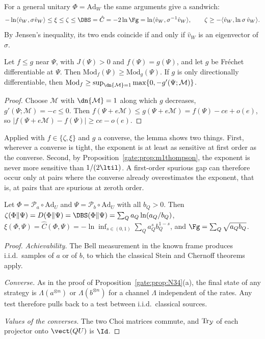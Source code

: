 For a general unitary $\Phi=\mathrm{Ad}_W$ the same arguments give a sandwich:
\begin{equation}\label{gate:eq:m1sandwich}
-\ln\langle\hat v_W,\sigma\hat v_W\rangle\le\xi\le\zeta\le\DBS=\hat C=-2\ln\Fg=\ln\langle\hat v_W,\sigma^{-1}\hat v_W\rangle,\qquad\zeta\ge-\langle\hat v_W,\ln\sigma\,\hat v_W\rangle.
\end{equation}
By Jensen's inequality, its two ends coincide if and only if $\hat v_W$ is an eigenvector of $\sigma$.

\begin{lemma}\label{gate:lem:m1tight}
Let $f\le g$ near $\Psi$, with $J(\Psi)>0$ and $f(\Psi)=g(\Psi)$, and let $g$ be Fr\'echet differentiable at $\Psi$. Then $\mathrm{Mod}_f(\Psi)\ge\mathrm{Mod}_g(\Psi)$. If $g$ is only directionally differentiable, then $\mathrm{Mod}_f\ge\sup_{\dn{\mathcal M}=1}\max\{0,-g'(\Psi;\mathcal M)\}$.
\end{lemma}

\begin{proof}
Choose $\mathcal M$ with $\dn{\mathcal M}=1$ along which $g$ decreases, $g'(\Psi;\mathcal M)=-c\le0$. Then $f(\Psi+e\mathcal M)\le g(\Psi+e\mathcal M)=f(\Psi)-ce+o(e)$, so $|f(\Psi+e\mathcal M)-f(\Psi)|\ge ce-o(e)$.
\end{proof}

Applied with $f\in\{\zeta,\xi\}$ and $g$ a converse, the lemma shows two things. First, wherever a converse is tight, the exponent is at least as sensitive at first order as the converse. Second, by Proposition~\ref{gate:prop:m1thompson}, the exponent is never more sensitive than $1/(2\ltil)$. A first-order spurious gap can therefore occur only at pairs where the converse already overestimates the exponent, that is, at pairs that are spurious at zeroth order.

\begin{proposition}\label{gate:prop:m1pauli}
Let $\Phi=\mathcal P_a\circ\mathrm{Ad}_U$ and $\Psi=\mathcal P_b\circ\mathrm{Ad}_U$ with all $b_Q>0$. Then $\zeta(\Phi\|\Psi)=D(\Phi\|\Psi)=\DBS(\Phi\|\Psi)=\sum_Qa_Q\ln(a_Q/b_Q)$, $\xi(\Phi,\Psi)=\hat C(\Phi,\Psi)=-\ln\inf_{s\in(0,1)}\sum_Qa_Q^sb_Q^{1-s}$, and $\Fg=\sum_Q\sqrt{a_Qb_Q}$.
\end{proposition}

\begin{proof}
\emph{Achievability.} The Bell measurement in the known frame produces i.i.d.\ samples of $a$ or of $b$, to which the classical Stein and Chernoff theorems apply.

\emph{Converse.} As in the proof of Proposition~\ref{gate:prop:N34}(a), the final state of any strategy is $\Lambda(a^{\otimes n})$ or $\Lambda(b^{\otimes n})$ for a channel $\Lambda$ independent of the rates. Any test therefore pulls back to a test between i.i.d.\ classical sources.

\emph{Values of the converses.} The two Choi matrices commute, and $\Tr_{\mathcal Y}$ of each projector onto $\vect(QU)$ is $\Id$.
\end{proof}

